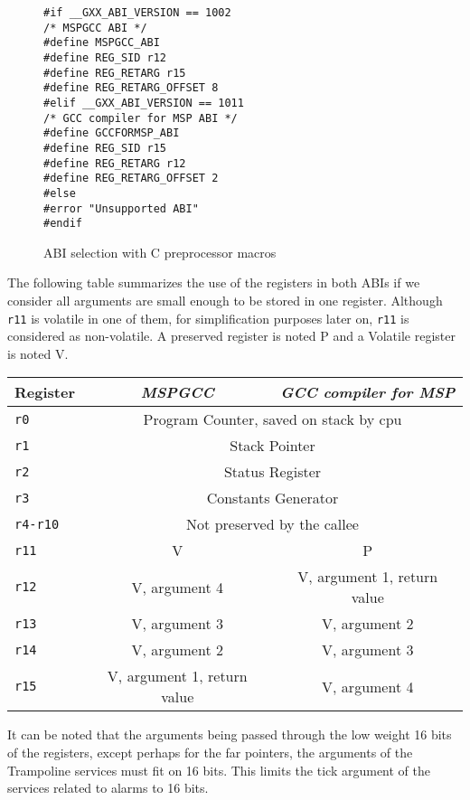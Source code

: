 \documentclass[11pt, oneside]{article}   	%
\begin{document}
\begin{figure}[h]
\caption{ABI selection with C preprocessor macros}
\begin{lstlisting}
#if __GXX_ABI_VERSION == 1002
/* MSPGCC ABI */
#define MSPGCC_ABI
#define REG_SID r12
#define REG_RETARG r15
#define REG_RETARG_OFFSET 8
#elif __GXX_ABI_VERSION == 1011
/* GCC compiler for MSP ABI */
#define GCCFORMSP_ABI
#define REG_SID r15
#define REG_RETARG r12
#define REG_RETARG_OFFSET 2
#else
#error "Unsupported ABI"
#endif
\end{lstlisting}
\label{lst:macroabi}
\end{figure}

The following table summarizes the use of the registers in both ABIs if we consider all arguments are small enough to be stored in one register. Although \lstinline{r11} is volatile in one of them, for simplification purposes later on, \lstinline{r11} is considered as non-volatile. A preserved register is noted P and a Volatile register is noted V.

\begin{center}
\begin{tabular}{|l|c|c|}
\hline
Register & \emph{MSPGCC} & \emph{GCC compiler for MSP} \\
\hline
\hline
\lstinline|r0| & \multicolumn{2}{c|}{Program Counter, saved on stack by cpu} \\
\hline
\lstinline|r1| & \multicolumn{2}{c|}{Stack Pointer} \\
\hline
\lstinline|r2| & \multicolumn{2}{c|}{Status Register} \\
\hline
\lstinline|r3| & \multicolumn{2}{c|}{Constants Generator} \\
\hline
\lstinline|r4-r10| & \multicolumn{2}{c|}{Not preserved by the callee} \\
\hline
\lstinline|r11| & V & P \\
\hline
\lstinline|r12| & V, argument 4 & V, argument 1, return value \\
\hline
\lstinline|r13| & V, argument 3 & V, argument 2 \\
\hline
\lstinline|r14| & V, argument 2 & V, argument 3 \\
\hline
\lstinline|r15| & V, argument 1, return value & V, argument 4 \\
\hline
\end{tabular}
\end{center}


It can be noted that the arguments being passed through the low weight 16 bits of the registers, except perhaps for the far pointers, the arguments of the Trampoline services must fit on 16 bits. This limits the tick argument of the services related to alarms to 16 bits. 
\end{document}
